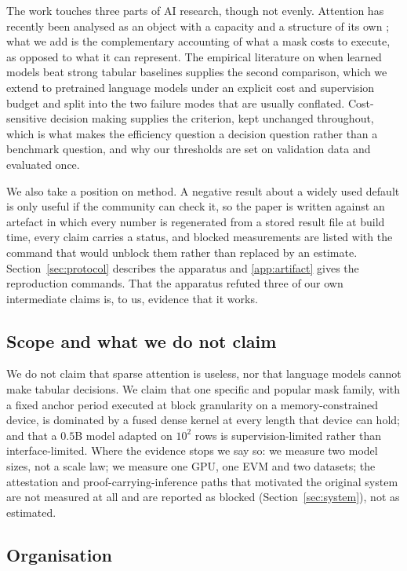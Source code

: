The work touches three parts of AI research, though not evenly. Attention has
recently been analysed as an object with a capacity and a structure of its own
\cite{baldi2023quarks}; what we add is the complementary accounting of what a
mask costs to execute, as opposed to what it can represent. The empirical
literature on when learned models beat strong tabular baselines
\cite{gorishniy2021revisiting,grinsztajn2022why} supplies the second comparison,
which we extend to pretrained language models under an explicit cost and
supervision budget and split into the two failure modes that are usually
conflated. Cost-sensitive decision making \cite{elkan2001foundations} supplies
the criterion, kept unchanged throughout, which is what makes the efficiency
question a decision question rather than a benchmark question, and why our
thresholds are set on validation data and evaluated once.

We also take a position on method. A negative result about a widely used default
is only useful if the community can check it, so the paper is written against an
artefact in which every number is regenerated from a stored result file at build
time, every claim carries a status, and blocked measurements are listed with the
command that would unblock them rather than replaced by an estimate.
Section~\ref{sec:protocol} describes the apparatus and \ref{app:artifact} gives
the reproduction commands. That the apparatus refuted three of our own
intermediate claims is, to us, evidence that it works.

\subsection{Scope and what we do not claim}

We do not claim that sparse attention is useless, nor that language models
cannot make tabular decisions. We claim that one specific and popular mask
family, with a fixed anchor period executed at block granularity on a
memory-constrained device, is dominated by a fused dense kernel at every length
that device can hold; and that a $0.5$B model adapted on $10^2$ rows is
supervision-limited rather than interface-limited. Where the evidence stops we
say so: we measure two model sizes, not a scale law; we measure one GPU, one
EVM and two datasets; the attestation and proof-carrying-inference paths that
motivated the original system are not measured at all and are reported as
blocked (Section~\ref{sec:system}), not as estimated.

\subsection{Organisation}

